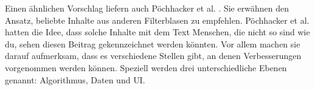 Einen ähnlichen Vorschlag liefern auch Pöchhacker et al. \cite{rundfunk}.
Sie erwähnen den Ansatz, beliebte Inhalte aus anderen Filterblasen zu empfehlen.
Pöchhacker et al. hatten die Idee, dass solche Inhalte mit dem Text \glqq Menschen, die nicht so sind wie du, sehen diesen Beitrag\grqq{} gekennzeichnet werden könnten.
Vor allem machen sie darauf aufmerksam, dass es verschiedene Stellen gibt, an denen Verbesserungen vorgenommen werden können.
Speziell werden drei unterschiedliche Ebenen genannt: Algorithmus, Daten und \ac{UI}.

